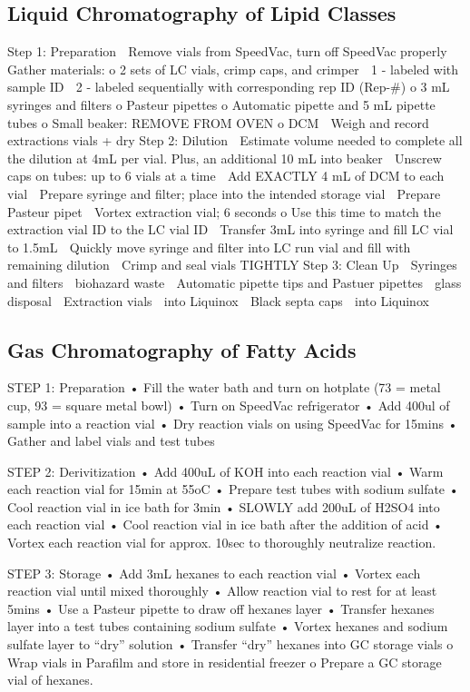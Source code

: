 \documentclass[review]{elsarticle}
\begin{document}
\subsection{Liquid Chromatography of Lipid Classes}
Step 1: Preparation
	Remove vials from SpeedVac, turn off SpeedVac properly
	Gather materials:
o	2 sets of LC vials, crimp caps, and crimper
	1 - labeled with sample ID
	2 - labeled sequentially with corresponding rep ID (Rep-#)
o	3 mL syringes and filters
o	Pasteur pipettes
o	Automatic pipette and 5 mL pipette tubes
o	Small beaker: REMOVE FROM OVEN
o	DCM
	Weigh and record extractions vials + dry
Step 2: Dilution
	Estimate volume needed to complete all the dilution at 4mL per vial. Plus, an additional 10 mL into beaker
	Unscrew caps on tubes: up to 6 vials at a time
	Add EXACTLY 4 mL of DCM to each vial
	Prepare syringe and filter; place into the intended storage vial
	Prepare Pasteur pipet
	Vortex extraction vial; 6 seconds 
o	Use this time to match the extraction vial ID to the LC vial ID
	Transfer 3mL into syringe and fill LC vial to 1.5mL
	Quickly move syringe and filter into LC run vial and fill with remaining dilution
	Crimp and seal vials TIGHTLY
Step 3: Clean Up
	Syringes and filters  biohazard waste
	Automatic pipette tips and Pastuer pipettes  glass disposal
	Extraction vials  into Liquinox
	Black septa caps  into Liquinox

\subsection{Gas Chromatography of Fatty Acids}
STEP 1: Preparation
•	Fill the water bath and turn on hotplate (73 = metal cup, 93 = square metal bowl)
•	Turn on SpeedVac refrigerator 
•	Add 400ul of sample into a reaction vial
•	Dry reaction vials on using SpeedVac for 15mins
•	Gather and label vials and test tubes

STEP 2: Derivitization
•	Add 400uL of KOH into each reaction vial
•	Warm each reaction vial for 15min at 55oC
•	Prepare test tubes with sodium sulfate
•	Cool  reaction vial in ice bath for 3min
•	SLOWLY add 200uL of H2SO4 into each reaction vial 
•	Cool reaction vial in ice bath after the addition of acid
•	Vortex each reaction vial for approx. 10sec to thoroughly neutralize reaction.

STEP 3: Storage
•	Add 3mL hexanes to each reaction vial
•	Vortex each reaction vial until mixed thoroughly
•	Allow reaction vial to rest for at least 5mins
•	Use a Pasteur pipette to draw off hexanes layer
•	Transfer hexanes layer into a test tubes containing sodium sulfate
•	Vortex hexanes and sodium sulfate layer to “dry” solution
•	Transfer “dry” hexanes into GC storage vials
o	Wrap vials in Parafilm and store in residential freezer
o	Prepare a GC storage vial of hexanes.
\end{document}
